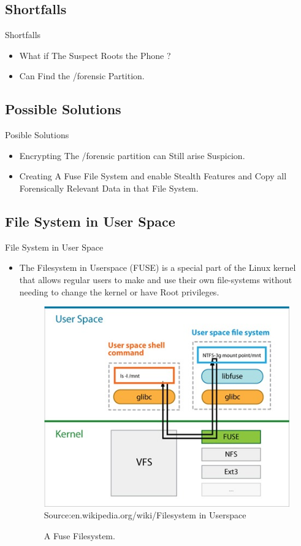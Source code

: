 \documentclass{beamer}
\begin{document}
\subsection{Shortfalls}
\begin{frame}{Shortfalls}

	\begin{itemize}
	
	\item{
	
	What if The Suspect Roots the Phone ?
	}
	\bigskip
	\item{
	
		Can Find the /forensic Partition.	
	}	
	\end{itemize}

\end{frame}
\subsection{Possible Solutions}
\begin{frame}{Posible Solutions}
	\begin{itemize}
	\item{
	Encrypting The /forensic partition can Still arise Suspicion.
	}
	\bigskip
	\item{
	Creating A Fuse File System and enable Stealth Features and Copy all Forensically Relevant Data in that File System.
	
	}
	\end{itemize}
\end{frame}
\subsection{File System in User Space}
\begin{frame}{File System in User Space}
\begin{itemize}
\item{
The Filesystem in Userspace (FUSE) is a special part of the Linux \indent kernel that \indent allows regular users to make and use their own file-systems \indent without needing to change the kernel or have Root privileges.
}

\begin{figure}
\centering
\caption{A Fuse Filesystem.}
\includegraphics[width=.6\textwidth,height=.5\textheight]{fuse}
\label{imageLabel}
\scriptsize{Source:en.wikipedia.org/wiki/Filesystem in Userspace}
\end{figure}
\end{itemize}
\end{frame}
\end{document}
